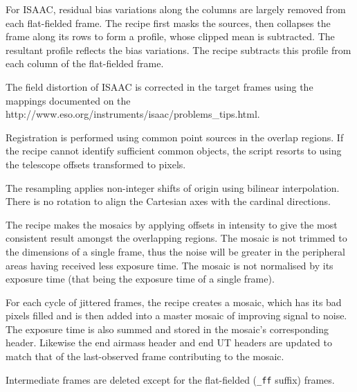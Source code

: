 \documentclass[twoside,11pt,nolof]{starlink}
\begin{document}
{{{         \sstitem
         For ISAAC, residual bias variations along the columns are
         largely removed from each flat-fielded frame.  The recipe first
         masks the sources, then collapses the frame along its rows to form
         a profile, whose clipped mean is subtracted.  The resultant profile
         reflects the bias variations.  The recipe subtracts this profile
         from each column of the flat-fielded frame.

         \sstitem
         The field distortion of ISAAC is corrected in the target frames
         using the mappings documented on the
         {http://www.eso.org/instruments/isaac/problems_tips.html}.

         \sstitem
         Registration is performed using common point sources in the
         overlap regions.  If the recipe cannot identify sufficient common
         objects, the script resorts to using the telescope offsets
         transformed to pixels.

         \sstitem
         The resampling applies non-integer shifts of origin using
         bilinear interpolation.  There is no rotation to align the
         Cartesian axes with the cardinal directions.

         \sstitem
         The recipe makes the mosaics by applying offsets in intensity
         to give the most consistent result amongst the overlapping regions.
         The mosaic is not trimmed to the dimensions of a single frame, thus
         the noise will be greater in the peripheral areas having received
         less exposure time.  The mosaic is not normalised by its exposure
         time (that being the exposure time of a single frame).

         \sstitem
         For each cycle of jittered frames, the recipe creates a mosaic,
         which has its bad pixels filled and is then added into a master
         mosaic of improving signal to noise.  The exposure time is also
         summed and stored in the mosaic's corresponding header.  Likewise
         the end airmass header and end UT headers are updated to match
         that of the last-observed frame contributing to the mosaic.

         \sstitem
         Intermediate frames are deleted except for the flat-fielded ({\tt\_ff}
         suffix) frames.
      }
   }
   }
\end{document}
